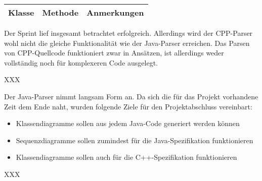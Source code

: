 \begin{table}[H]

\begin{tabularx}{\textwidth}{ |l|l|X| }
\hline
\textbf{Klasse} & \textbf{Methode} & \textbf{Anmerkungen}\\
\hline
\end{tabularx}
\end{table}

\nsecend%

Der Sprint lief insgesamt betrachtet erfolgreich. Allerdings wird der CPP-Parser wohl nicht die gleiche Funktionalität wie der Java-Parser erreichen. Das Parsen von CPP-Quellcode funktioniert zwar in Ansätzen, ist allerdings weder vollständig noch für komplexeren Code ausgelegt.
\nsecend%

XXX
\nsecend%

Der Java-Parser nimmt langsam Form an. Da sich die für das Projekt vorhandene Zeit dem Ende naht, wurden folgende Ziele für den Projektabschluss vereinbart:
\begin{itemize}
\item Klassendiagramme sollen aus jedem Java-Code generiert werden können
\item Sequenzdiagramme sollen zumindest für die Java-Spezifikation funktionieren
\item Klassendiagramme sollen auch für die C++-Spezifikation funktionieren
\end{itemize}
\nsecend%

XXX
\nsecend%
